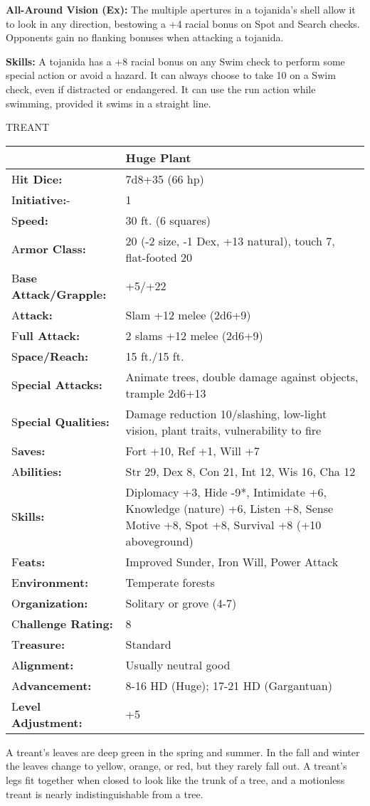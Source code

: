 \documentclass{article}
\begin{document}
\textbf{All-Around Vision (Ex): }The multiple apertures in a tojanida's shell allow 
it to look in any direction, bestowing a +4 racial bonus on Spot and Search checks. 
Opponents gain no flanking bonuses when attacking a tojanida.

\textbf{Skills:} A tojanida has a +8 racial bonus on any Swim check to perform 
some special action or avoid a hazard. It can always choose to take 10 on a Swim 
check, even if distracted or endangered. It can use the run action while swimming, 
provided it swims in a straight line.

\vspace{12pt}
{\LARGE{}TREANT}

\begin{tabular}{|>{\raggedright}p{88pt}|>{\raggedright}p{237pt}|}
\hline
  & Huge Plant\tabularnewline
\hline
H\textbf{it Dice:} & 7d8+35 (66 hp)\tabularnewline
\hline
I\textbf{nitiative:}- & 1\tabularnewline
\hline
S\textbf{peed:} & 30 ft. (6 squares)\tabularnewline
\hline
A\textbf{rmor Class:} & 20 (-2 size, -1 Dex, +13 natural), touch 7, flat-footed 
20\tabularnewline
\hline
B\textbf{ase Attack/Grapple:} & +5/+22\tabularnewline
\hline
A\textbf{ttack:} & Slam +12 melee (2d6+9)\tabularnewline
\hline
F\textbf{ull Attack:} & 2 slams +12 melee (2d6+9)\tabularnewline
\hline
S\textbf{pace/Reach:} & 15 ft./15 ft.\tabularnewline
\hline
S\textbf{pecial Attacks:} & Animate trees, double damage against objects, trample 
2d6+13\tabularnewline
\hline
S\textbf{pecial Qualities:} & Damage reduction 10/slashing, low-light vision, plant 
traits, vulnerability to fire\tabularnewline
\hline
S\textbf{aves:} & Fort +10, Ref +1, Will +7\tabularnewline
\hline
A\textbf{bilities:} & Str 29, Dex 8, Con 21, Int 12, Wis 16, Cha 12\tabularnewline
\hline
S\textbf{kills:} & Diplomacy +3, Hide -9*, Intimidate +6, Knowledge (nature) +6, 
Listen +8, Sense Motive +8, Spot +8, Survival +8 (+10 aboveground)\tabularnewline
\hline
F\textbf{eats:} & Improved Sunder, Iron Will, Power Attack\tabularnewline
\hline
E\textbf{nvironment:} & Temperate forests\tabularnewline
\hline
O\textbf{rganization:} & Solitary or grove (4-7)\tabularnewline
\hline
C\textbf{hallenge Rating:} & 8\tabularnewline
\hline
T\textbf{reasure:} & Standard\tabularnewline
\hline
A\textbf{lignment:} & Usually neutral good\tabularnewline
\hline
A\textbf{dvancement:} & 8-16 HD (Huge); 17-21 HD (Gargantuan)\tabularnewline
\hline
L\textbf{evel Adjustment:} & +5\tabularnewline
\hline
\end{tabular}

A treant's leaves are deep green in the spring and summer. In the fall and winter 
the leaves change to yellow, orange, or red, but they rarely fall out. A treant's 
legs fit together when closed to look like the trunk of a tree, and a motionless 
treant is nearly indistinguishable from a tree.
\end{document}

